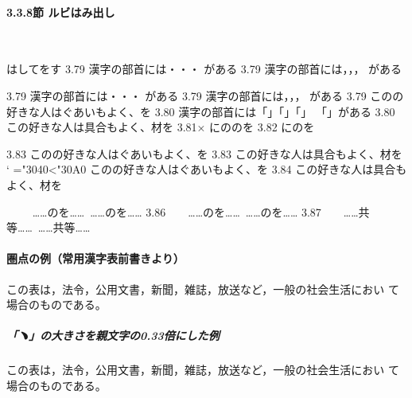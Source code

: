 \documentclass[a4paper,10pt]{ltjsarticle}
\begin{document}
\paragraph{3.3.8節 ルビはみ出し}\ 
\begin{LTXexample}[pos=t]
 はしてをす
3.79 漢字の部首には・・・%
     がある
3.79 漢字の部首には，，，%
     \ruby{旁}{つくり}がある
\end{LTXexample}
\begin{LTXexample}[pos=t]
\obeylines
3.79 漢字の部首には・・・%
     がある
3.79 漢字の部首には，，，%
     \ruby{旁}{つくり}がある
3.79 このの好きな人はぐあいもよく、を
3.80 漢字の部首には「」「」「」%
「」がある
3.80 この好きな人は具合もよく、材を
3.81× にの\zw のを
3.82 に\ruby{暁}{あかつき}の\ruby{趣}{おもむき}を

{%
3.83 このの好きな人はぐあいもよく、を
3.83 この\ruby{\噂}{うわさ}好きな人は\ruby{懐}{ふところ}具合もよく、\ruby{檜}{ひのき}材を
}
{\catcode`%
  \makeatletter\count@="3040\loop\relax\ifnum \count@<"30A0%
  \advance{}  このの好きな人はぐあいもよく、を
3.84 この\ruby{\噂}{うわさ}好きな人は\ruby{懐}{ふところ}具合もよく、\ruby{檜}{ひのき}材を
}
\end{LTXexample}
\begin{LTXexample}[pos=t]
\ {%
\hbox{\vrule\vbox{\zw
　\zw……のを……%
\hskip9\zw……の\ruby{徑}{こみち}を……}\vrule}}
3.86\ \hbox{\vrule\vbox{\zw
　\zw……のを……%
\zw……の\ruby{徑}{こみち}を……}\vrule}
3.87\  \hbox{\vrule\vbox{\zw
　\zw……共等……%
\zw……共\ruby{飾り}{アクセサリー}等……}\vrule}
\end{LTXexample}


\paragraph{圏点の例（常用漢字表前書きより）}
この表は，法令，公⽤⽂書，新聞，雑誌，放送など，⼀般の社会⽣活におい%
て場合のものである。

\subparagraph{「﹅」の大きさを親文字の0.33倍にした例}
この表は，法令，公⽤⽂書，新聞，雑誌，放送など，⼀般の社会⽣活におい%
て場合のものである。
\end{document}

